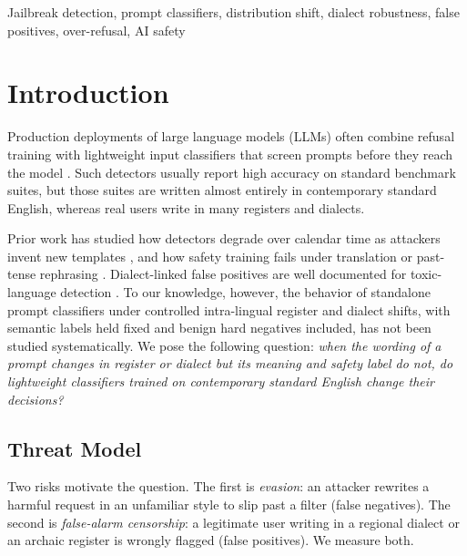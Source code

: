 \documentclass[conference]{IEEEtran}
\begin{document}
\begin{IEEEkeywords}
Jailbreak detection, prompt classifiers, distribution shift, dialect robustness, false positives, over-refusal, AI safety
\end{IEEEkeywords}

\section{Introduction}
\label{sec:intro}
Production deployments of large language models (LLMs) often combine refusal training with lightweight input classifiers that screen prompts before they reach the model \cite{han2024wildguard, fomin2026whenbenchmarkslie}. Such detectors usually report high accuracy on standard benchmark suites, but those suites are written almost entirely in contemporary standard English, whereas real users write in many registers and dialects.

Prior work has studied how detectors degrade over calendar time as attackers invent new templates \cite{piet2025jailbreaksovertime}, and how safety training fails under translation or past-tense rephrasing \cite{andriushchenko2025refusal, deng2024multilingual}. Dialect-linked false positives are well documented for toxic-language detection \cite{sap2019risk}. To our knowledge, however, the behavior of standalone prompt classifiers under controlled intra-lingual register and dialect shifts, with semantic labels held fixed and benign hard negatives included, has not been studied systematically. We pose the following question: \textit{when the wording of a prompt changes in register or dialect but its meaning and safety label do not, do lightweight classifiers trained on contemporary standard English change their decisions?}

\subsection{Threat Model}
Two risks motivate the question. The first is \textit{evasion}: an attacker rewrites a harmful request in an unfamiliar style to slip past a filter (false negatives). The second is \textit{false-alarm censorship}: a legitimate user writing in a regional dialect or an archaic register is wrongly flagged (false positives). We measure both.
\end{document}
